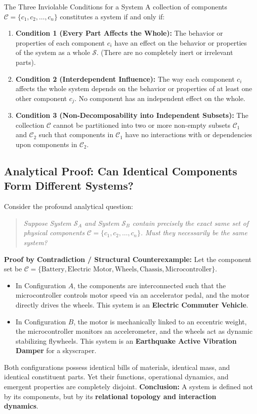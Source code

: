 \begin{definitionbox}{The Three Inviolable Conditions for a System}
A collection of components $\mathcal{C} = \{c_1, c_2, \dots, c_n\}$ constitutes a system if and only if:
\begin{enumerate}[leftmargin=2em]
    \item \textbf{Condition 1 (Every Part Affects the Whole):} The behavior or properties of each component $c_i$ have an effect on the behavior or properties of the system as a whole $\mathcal{S}$. (There are no completely inert or irrelevant parts).
    \item \textbf{Condition 2 (Interdependent Influence):} The way each component $c_i$ affects the whole system depends on the behavior or properties of at least one other component $c_j$. No component has an independent effect on the whole.
    \item \textbf{Condition 3 (Non-Decomposability into Independent Subsets):} The collection $\mathcal{C}$ cannot be partitioned into two or more non-empty subsets $\mathcal{C}_1$ and $\mathcal{C}_2$ such that components in $\mathcal{C}_1$ have no interactions with or dependencies upon components in $\mathcal{C}_2$.
\end{enumerate}
\end{definitionbox}

\subsection{Analytical Proof: Can Identical Components Form Different Systems?}
Consider the profound analytical question:
\begin{quote}
\textit{Suppose System $\mathcal{S}_A$ and System $\mathcal{S}_B$ contain precisely the exact same set of physical components $\mathcal{C} = \{c_1, c_2, \dots, c_n\}$. Must they necessarily be the same system?}
\end{quote}
\textbf{Proof by Contradiction / Structural Counterexample:}
Let the component set be $\mathcal{C} = \{\text{Battery}, \text{Electric Motor}, \text{Wheels}, \text{Chassis}, \text{Microcontroller}\}$.
\begin{itemize}[leftmargin=1.5em]
    \item In Configuration $A$, the components are interconnected such that the microcontroller controls motor speed via an accelerator pedal, and the motor directly drives the wheels. This system is an \textbf{Electric Commuter Vehicle}.
    \item In Configuration $B$, the motor is mechanically linked to an eccentric weight, the microcontroller monitors an accelerometer, and the wheels act as dynamic stabilizing flywheels. This system is an \textbf{Earthquake Active Vibration Damper} for a skyscraper.
\end{itemize}
Both configurations possess identical bills of materials, identical mass, and identical constituent parts. Yet their functions, operational dynamics, and emergent properties are completely disjoint. 
\textbf{Conclusion:} A system is defined not by its components, but by its \textbf{relational topology and interaction dynamics}.


